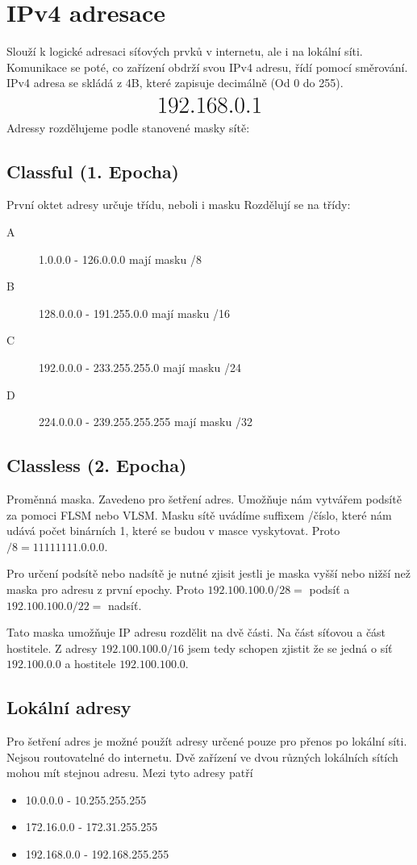 \section{IPv4 adresace}
\label{sec:ipv4-adresace}
Slouží k logické adresaci síťových prvků v internetu, ale i na lokální síti.
Komunikace se poté, co zařízení obdrží svou IPv4 adresu, řídí pomocí směrování.
IPv4 adresa se skládá z 4B, které zapisuje decimálně (Od 0 do 255).
\[\mathlarger{\mathlarger{\mathlarger{\mathlarger{192.168.0.1}}}}\]
Adressy rozdělujeme podle stanovené masky sítě:
\subsection{Classful (1. Epocha)}
První oktet adresy určuje třídu, neboli i masku
Rozdělují se na třídy:
\begin{description}
  \item[A] 1.0.0.0 - 126.0.0.0 mají masku /8
  \item[B] 128.0.0.0 - 191.255.0.0 mají masku /16
  \item[C] 192.0.0.0 - 233.255.255.0 mají masku /24
  \item[D] 224.0.0.0 - 239.255.255.255 mají masku /32 
\end{description}
\subsection{Classless (2. Epocha)}
Proměnná maska.
Zavedeno pro šetření adres.
Umožňuje nám vytvářem podsítě za pomoci FLSM nebo VLSM.
Masku sítě uvádíme suffixem /číslo, které nám udává počet binárních 1, které se budou v masce vyskytovat.
Proto $/8 = 1111 1111.0.0.0$.

Pro určení podsítě nebo nadsítě je nutné zjisit jestli je maska vyšší nebo nižší než maska pro adresu z první epochy.
Proto $192.100.100.0/28 =$ podsíť a $192.100.100.0/22 =$ nadsíť.

Tato maska umožňuje IP adresu rozdělit na dvě části.
Na část síťovou a část hostitele.
Z adresy $192.100.100.0/16$ jsem tedy schopen zjistit že se jedná o síť $192.100.0.0$ a hostitele $192.100.100.0$.
\subsection{Lokální adresy}
Pro šetření adres je možné použít adresy určené pouze pro přenos po lokální síti.
Nejsou routovatelné do internetu.
Dvě zařízení ve dvou různých lokálních sítích mohou mít stejnou adresu.
Mezi tyto adresy patří
\begin{itemize}
  \item 10.0.0.0 - 10.255.255.255
  \item 172.16.0.0 - 172.31.255.255
  \item 192.168.0.0 - 192.168.255.255
\end{itemize}
